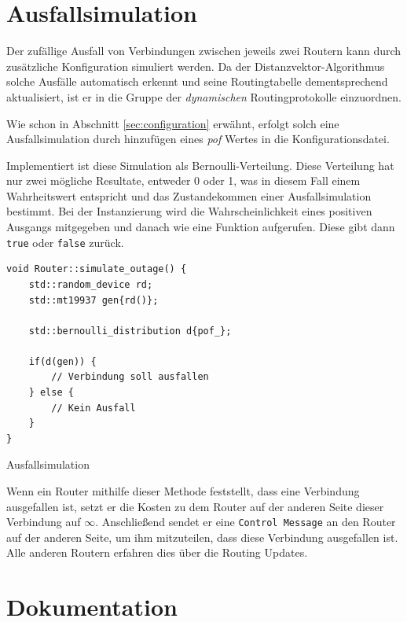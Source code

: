 \documentclass[a4paper,ngerman]{article}
\begin{document}
\section{Ausfallsimulation}
\label{sec:outage_simulation}

Der zufällige Ausfall von Verbindungen zwischen jeweils zwei Routern kann durch zusätzliche Konfiguration simuliert werden. Da der Distanzvektor-Algorithmus solche Ausfälle automatisch erkennt und seine Routingtabelle dementsprechend aktualisiert, ist er in die Gruppe der \textit{dynamischen} Routingprotokolle einzuordnen.

Wie schon in Abschnitt \vref{sec:configuration} erwähnt, erfolgt solch eine Ausfallsimulation durch hinzufügen eines \textit{pof} Wertes in die Konfigurationsdatei.

Implementiert ist diese Simulation als Bernoulli-Verteilung. Diese Verteilung hat nur zwei mögliche Resultate, entweder 0 oder 1, was in diesem Fall einem Wahrheitswert entspricht und das Zustandekommen einer Ausfallsimulation bestimmt. Bei der Instanzierung wird die Wahrscheinlichkeit eines positiven Ausgangs mitgegeben und danach wie eine Funktion aufgerufen. Diese gibt dann \lstinline{true} oder \lstinline{false} zurück.

\begin{listing}
\begin{verbatim}
void Router::simulate_outage() {
    std::random_device rd;
    std::mt19937 gen{rd()};

    std::bernoulli_distribution d{pof_};

    if(d(gen)) {
        // Verbindung soll ausfallen
    } else {
        // Kein Ausfall
    }
}
\end{verbatim}

\caption{Ausfallsimulation}
\label{code:simulate_outage}
\end{listing}


Wenn ein Router mithilfe dieser Methode feststellt, dass eine Verbindung ausgefallen ist, setzt er die Kosten zu dem Router auf der anderen Seite dieser Verbindung auf $ \infty $. Anschließend sendet er eine \lstinline{Control Message} an den Router auf der anderen Seite, um ihm mitzuteilen, dass diese Verbindung ausgefallen ist. Alle anderen Routern erfahren dies über die Routing Updates.

\section{Dokumentation}
\end{document}
